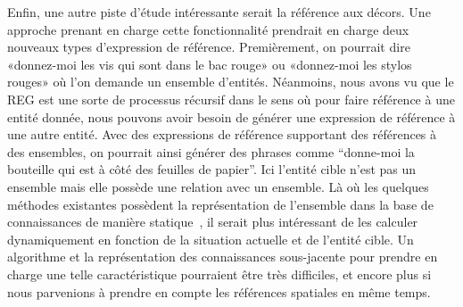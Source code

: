Enfin, une autre piste d'étude intéressante serait la référence aux décors. Une approche prenant en charge cette fonctionnalité prendrait en charge deux nouveaux types d'expression de référence. Premièrement, on pourrait dire «donnez-moi les vis qui sont dans le bac rouge» ou «donnez-moi les stylos rouges» où l'on demande un ensemble d'entités. Néanmoins, nous avons vu que le REG est une sorte de processus récursif dans le sens où pour faire référence à une entité donnée, nous pouvons avoir besoin de générer une expression de référence à une autre entité. Avec des expressions de référence supportant des références à des ensembles, on pourrait ainsi générer des phrases comme ``donne-moi la bouteille qui est à côté des feuilles de papier''. Ici l'entité cible n'est pas un ensemble mais elle possède une relation avec un ensemble. Là où les quelques méthodes existantes possèdent la représentation de l'ensemble dans la base de connaissances de manière statique~\cite{fang_2013_towards}, il serait plus intéressant de les calculer dynamiquement en fonction de la situation actuelle et de l'entité cible. Un algorithme et la représentation des connaissances sous-jacente pour prendre en charge une telle caractéristique pourraient être très difficiles, et encore plus si nous parvenions à prendre en compte les références spatiales en même temps. 